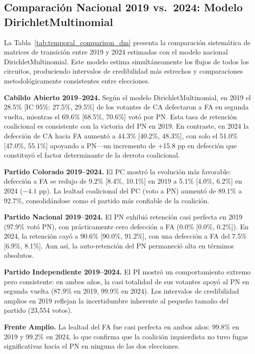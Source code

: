 \subsection{Comparación Nacional 2019 vs.\ 2024: Modelo DirichletMultinomial}
\label{sec:comparacion_dm}

La Tabla~\ref{tab:temporal_comparison_dm} presenta la comparación sistemática de matrices de transición entre 2019 y 2024 estimadas con el modelo nacional DirichletMultinomial. Este modelo estima simultáneamente los flujos de todos los circuitos, produciendo intervalos de credibilidad más estrechos y comparaciones metodológicamente consistentes entre elecciones.



\textbf{Cabildo Abierto 2019--2024.} Según el modelo DirichletMultinomial, en 2019 el 28.5\% [IC 95\%: 27.5\%, 29.5\%] de los votantes de CA defectaron a FA en segunda vuelta, mientras el 69.6\% [68.5\%, 70.6\%] votó por PN. Esta tasa de retención coalicional es consistente con la victoria del PN en 2019. En contraste, en 2024 la defección de CA hacia FA aumentó a 44.3\% [40.2\%, 48.3\%], con solo el 51.0\% [47.0\%, 55.1\%] apoyando a PN---un incremento de +15.8 pp en defección que constituyó el factor determinante de la derrota coalicional.

\textbf{Partido Colorado 2019--2024.} El PC mostró la evolución más favorable: defección a FA se redujo de 9.2\% [8.4\%, 10.1\%] en 2019 a 5.1\% [4.0\%, 6.2\%] en 2024 ($-4.1$ pp). La lealtad coalicional del PC (voto a PN) aumentó de 89.1\% a 92.7\%, consolidándose como el partido más confiable de la coalición.

\textbf{Partido Nacional 2019--2024.} El PN exhibió retención casi perfecta en 2019 (97.9\% votó PN), con prácticamente cero defección a FA (0.0\% [0.0\%, 0.2\%]). En 2024, la retención cayó a 90.6\% [90.0\%, 91.2\%], con una defección a FA del 7.5\% [6.9\%, 8.1\%]. Aun así, la auto-retención del PN permaneció alta en términos absolutos.

\textbf{Partido Independiente 2019--2024.} El PI mostró un comportamiento extremo pero consistente: en ambos años, la casi totalidad de sus votantes apoyó al PN en segunda vuelta (87.9\% en 2019, 99.9\% en 2024). Los intervalos de credibilidad amplios en 2019 reflejan la incertidumbre inherente al pequeño tamaño del partido (23{,}554 votos).

\textbf{Frente Amplio.} La lealtad del FA fue casi perfecta en ambos años: 99.8\% en 2019 y 99.2\% en 2024, lo que confirma que la coalición izquierdista no tuvo fugas significativas hacia el PN en ninguna de las dos elecciones.

